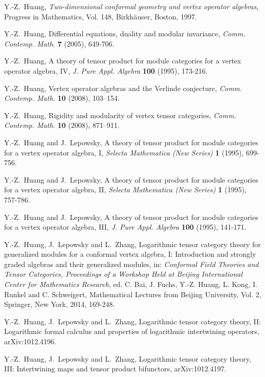 \documentclass[12pt]{article}
\begin{document}
\begin{thebibliography}{FGST2}
 Y.-Z.~Huang, {\em Two-dimensional conformal geometry and
vertex operator algebras}, Progress in Mathematics, Vol. 148,
Birkh\"auser, Boston, 1997.

 Y.-Z.~Huang, Differential equations, duality and modular
invariance, {\em Comm. Contemp. Math.} {\bf 7} (2005), 649-706.

 Y.-Z.~Huang, A theory of tensor product
for module categories for a vertex operator algebra, IV, {\em
J. Pure Appl. Algebra} {\bf 100} (1995), 173-216.

 Y.-Z.~Huang, Vertex operator algebras and the Verlinde
conjecture, {\em Comm. Contemp. Math.} {\bf 10} (2008), 103--154.

 Y.-Z.~Huang, Rigidity and modularity of vertex tensor
  categories, {\em Comm. Contemp. Math.} {\bf 10} (2008), 871--911.

 Y.-Z.~Huang and J.~Lepowsky, A theory of tensor product
for module categories for a vertex operator algebra, I, {\em
Selecta Mathematica (New Series)} {\bf 1} (1995), 699-756.

 Y.-Z.~Huang and J.~Lepowsky, A theory of tensor product
for module categories for a vertex operator algebra, II, {\em
Selecta Mathematica (New Series)} {\bf 1} (1995), 757-786.

 Y.-Z.~Huang and J.~Lepowsky, A theory of tensor product
for module categories for a vertex operator algebra, III, {\em
J. Pure Appl. Algebra} {\bf 100} (1995), 141-171.

 Y.-Z.~Huang, J.~Lepowsky and L.~Zhang, Logarithmic
tensor category theory for generalized modules for a conformal
vertex algebra, I: Introduction and strongly graded
algebras and their generalized modules, in:
{\em Conformal Field Theories and Tensor Categories, Proceedings of a Workshop
Held at Beijing International Center for Mathematics Research},
ed. C. Bai, J. Fuchs, Y.-Z. Huang, L. Kong, I. Runkel and C. Schweigert,
Mathematical Lectures from Beijing University, Vol. 2, Springer, New York, 2014,
169-248.  

 Y.-Z.~Huang, J.~Lepowsky and L.~Zhang, Logarithmic
tensor category theory, II: Logarithmic formal calculus and properties of 
logarithmic intertwining operators, arXiv:1012.4196.

 Y.-Z.~Huang, J.~Lepowsky and L.~Zhang, Logarithmic
tensor category theory, III: Intertwining maps and tensor product bifunctors,
arXiv:1012.4197.


\end{thebibliography}
\end{document}
